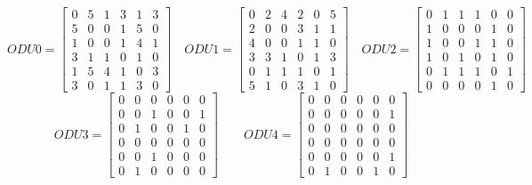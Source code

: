 \[
ODU0=
  \begin{bmatrix}
    0 & 5 & 1 & 3 & 1 & 3 \\
    5 & 0 & 0 & 1 & 5 & 0 \\
    1 & 0 & 0 & 1 & 4 & 1 \\
    3 & 1 & 1 & 0 & 1 & 0 \\
    1 & 5 & 4 & 1 & 0 & 3 \\
    3 & 0 & 1 & 1 & 3 & 0
  \end{bmatrix}
\quad ODU1=
  \begin{bmatrix}
    0 & 2 & 4 & 2 & 0 & 5 \\
    2 & 0 & 0 & 3 & 1 & 1 \\
    4 & 0 & 0 & 1 & 1 & 0 \\
    3 & 3 & 1 & 0 & 1 & 3 \\
    0 & 1 & 1 & 1 & 0 & 1 \\
    5 & 1 & 0 & 3 & 1 & 0
  \end{bmatrix}
\quad ODU2=
  \begin{bmatrix}
    0 & 1 & 1 & 1 & 0 & 0 \\
    1 & 0 & 0 & 0 & 1 & 0 \\
    1 & 0 & 0 & 1 & 1 & 0 \\
    1 & 0 & 1 & 0 & 1 & 0 \\
    0 & 1 & 1 & 1 & 0 & 1 \\
    0 & 0 & 0 & 0 & 1 & 0
  \end{bmatrix}
\]
\[
ODU3=
  \begin{bmatrix}
    0 & 0 & 0 & 0 & 0 & 0 \\
    0 & 0 & 1 & 0 & 0 & 1 \\
    0 & 1 & 0 & 0 & 1 & 0 \\
    0 & 0 & 0 & 0 & 0 & 0 \\
    0 & 0 & 1 & 0 & 0 & 0 \\
    0 & 1 & 0 & 0 & 0 & 0
  \end{bmatrix}
\qquad ODU4=
  \begin{bmatrix}
    0 & 0 & 0 & 0 & 0 & 0 \\
    0 & 0 & 0 & 0 & 0 & 1 \\
    0 & 0 & 0 & 0 & 0 & 0 \\
    0 & 0 & 0 & 0 & 0 & 0 \\
    0 & 0 & 0 & 0 & 0 & 1 \\
    0 & 1 & 0 & 0 & 1 & 0
  \end{bmatrix}
\]

\vspace{17pt}


